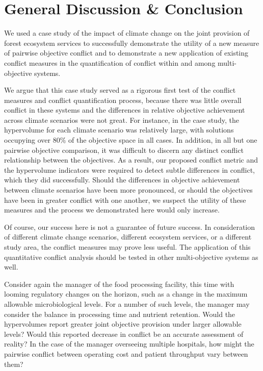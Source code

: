 \chapter{General Discussion \& Conclusion}
We used a case study of the impact of climate change on the joint provision of forest ecosystem services to successfully demonstrate the utility of a new measure of pairwise objective conflict and to demonstrate a new application of existing conflict measures in the quantification of conflict within and among multi-objective systems.

We argue that this case study served as a rigorous first test of the conflict measures and conflict quantification process, because there was little overall conflict in these systems and the differences in relative objective achievement across climate scenarios were not great. For instance, in the case study, the hypervolume for each climate scenario was relatively large, with solutions occupying over 80\% of the objective space in all cases. In addition, in all but one pairwise objective comparison, it was difficult to discern any distinct conflict relationship between the objectives. As a result, our proposed conflict metric and the hypervolume indicators were required to detect subtle differences in conflict, which they did successfully. Should the differences in objective achievement between climate scenarios have been more pronounced, or should the objectives have been in greater conflict with one another, we suspect the utility of these measures and the process we demonstrated here would only increase.

Of course, our success here is not a guarantee of future success. In consideration of different climate change scenarios, different ecosystem services, or a different study area, the conflict measures may prove less useful. The application of this quantitative conflict analysis should be tested in other multi-objective systems as well.

Consider again the manager of the food processing facility, this time with looming regulatory changes on the horizon, such as a change in the maximum allowable microbiological levels. For a number of such levels, the manager may consider the balance in processing time and nutrient retention. Would the hypervolumes report greater joint objective provision under larger allowable levels? Would this reported decrease in conflict be an accurate assessment of reality? In the case of the manager overseeing multiple hospitals, how might the pairwise conflict between operating cost and patient throughput vary between them?

